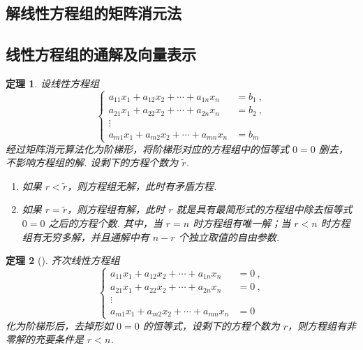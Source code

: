 \documentclass[zihao=-4,UTF8,linespread=1.8,nothm]{aytony_base}
\newtheorem{theorem}{\indent 定理}[subsection]
\begin{document}
\subsection{解线性方程组的矩阵消元法}

\subsection{线性方程组的通解及向量表示}

\begin{theorem}
    设线性方程组 $$
        \left\{
        \begin{aligned}
            a_{11}x_1 + a_{12}x_2 + \cdots + a_{1n}x_n & = b_1\ , \\
            a_{21}x_1 + a_{22}x_2 + \cdots + a_{2n}x_n & = b_2\ , \\
            \vdots                                                \\
            a_{m1}x_1 + a_{m2}x_2 + \cdots + a_{mn}x_n & = b_m
        \end{aligned}
        \right.
    $$ 经过矩阵消元算法化为阶梯形，将阶梯形对应的方程组中的恒等式 $0=0$ 删去，不影响方程组的解. 设剩下的方程个数为 $\tilde{r}$.

    \begin{enumerate}[nosep]
        \item 如果 $r < \tilde{r}$，则方程组无解，此时有矛盾方程.
        \item 如果 $r = \tilde{r}$，则方程组有解，此时 $r$ 就是具有最简形式的方程组中除去恒等式 $0=0$ 之后的方程个数. 其中，当 $r=n$ 时方程组有唯一解；当 $r<n$ 时方程组有无穷多解，并且通解中有 $n-r$ 个独立取值的自由参数.
    \end{enumerate}
\end{theorem}

\begin{theorem}[]
    齐次线性方程组 $$
        \left\{
        \begin{aligned}
            a_{11}x_1 + a_{12}x_2 + \cdots + a_{1n}x_n & = 0\ , \\
            a_{21}x_1 + a_{22}x_2 + \cdots + a_{2n}x_n & = 0\ , \\
            \vdots                                              \\
            a_{m1}x_1 + a_{m2}x_2 + \cdots + a_{mn}x_n & = 0
        \end{aligned}
        \right.
    $$ 化为阶梯形后，去掉形如 $0=0$ 的恒等式，设剩下的方程个数为 $r$，则方程组有非零解的充要条件是 $r<n$.
\end{theorem}
\end{document}
